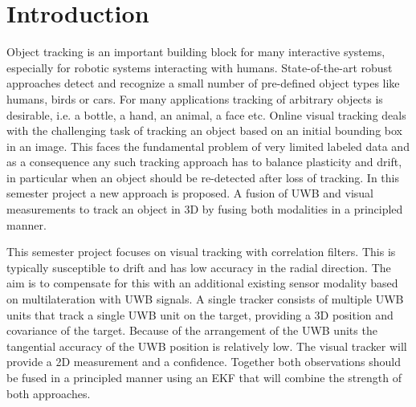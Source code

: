 
\setcounter{chapter}{0}

\chapter{Introduction}

Object tracking is an important building block for	many interactive systems, especially for robotic systems interacting with humans. State-of-the-art robust approaches detect and recognize a small number of pre-defined	object types like humans,	birds	or cars. For	many applications tracking of arbitrary objects	is desirable, i.e. a bottle,	a hand, an animal, a face etc. Online visual tracking deals with the	challenging	task of tracking an object based on an initial bounding box in an image. This faces the fundamental problem of very limited labeled data and as a consequence any such tracking approach has to balance plasticity and drift, in particular when an object	should	be re-detected after loss of tracking. In this semester project a new approach is proposed. A fusion of \ac{UWB} and visual	measurements to track an object in 3D by fusing both modalities in a principled manner.

This semester project focuses on visual tracking with correlation filters. This is typically susceptible to drift and has low accuracy in the radial direction. The aim is to compensate for this with an additional existing sensor modality based on multilateration with \ac{UWB} signals. A single tracker consists of multiple \ac{UWB} units that track a single \ac{UWB} unit on the target, providing a 3D position and covariance of the target. Because of the arrangement of the \ac{UWB} units the tangential accuracy of the \ac{UWB} position is relatively low. The visual tracker will provide a 2D measurement and a confidence. Together both observations should be fused in a principled manner using an \ac{EKF} that will combine the strength of both approaches.